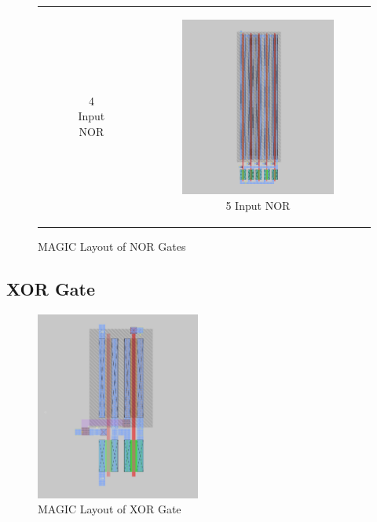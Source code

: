 \documentclass[conference]{IEEEtran}
\begin{document}
\begin{figure}[H]
\begin{tabular}{cc}
\begin{subfigure}{0.44\linewidth}
            \caption{4 Input NOR}
        \end{subfigure} &
        \begin{subfigure}{0.44\linewidth}
            \centering
            \includegraphics[width=\textwidth]{images/nor_5_cmos_layout.png}
            \caption{5 Input NOR}
        \end{subfigure}
    \end{tabular}
    \caption{MAGIC Layout of NOR Gates}
\end{figure}

\subsection{XOR Gate}

\begin{figure}[H]
    \centering
    \includegraphics[width=0.48\textwidth]{images/xor_optimized_layout.png}
    \caption{MAGIC Layout of XOR Gate}
\end{figure}
\end{document}
